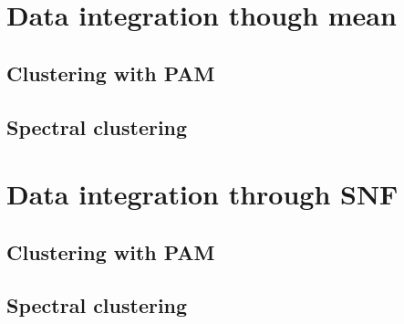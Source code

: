 \section{Data integration though mean}
\subsection{Clustering with PAM}
\subsection{Spectral clustering}
\section{Data integration through SNF}
\subsection{Clustering with PAM}
\subsection{Spectral clustering}